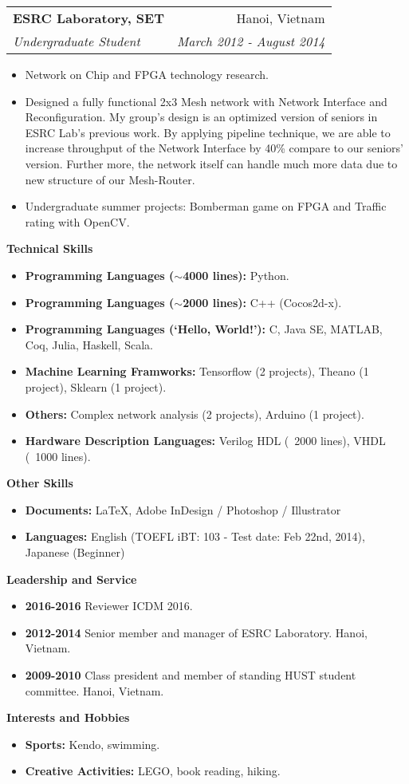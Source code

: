 \documentclass[letter,11pt]{article}
\makeatletter
\newcommand{\resitem}[1]{\item #1 \vspace{-2pt}}
\newcommand{\resheading}[1]{{\large \colorbox{mygrey}{\begin{minipage}{\textwidth}{\textbf{#1 \vphantom{p\^{E}}}}\end{minipage}}}}
\newcommand{\ressubheading}[4]{
\begin{tabular*}{6.5in}{l@{\extracolsep{\fill}}r}
		\textbf{#1} & #2 \\
		\textit{#3} & \textit{#4} \\
\end{tabular*}\vspace{-6pt}}
\makeatother
\begin{document}
\begin{itemize}
\begin{itemize}
    \end{itemize}
	\ressubheading{ESRC Laboratory, SET}{Hanoi, Vietnam}{Undergraduate Student}{March 2012 - August 2014}
	\begin{itemize}
		\resitem{Network on Chip and FPGA technology research.}
		\resitem{Designed a fully functional 2x3 Mesh network with Network Interface and Reconfiguration. My group's design is an optimized version of seniors in ESRC Lab's previous work. By applying pipeline technique, we are able to increase throughput of the Network Interface by 40\% compare to our seniors' version. Further more, the network itself can handle much more data due to new structure of our Mesh-Router.}
        \resitem{Undergraduate summer projects: Bomberman game on FPGA and Traffic rating with OpenCV.}
	\end{itemize}
\end{itemize}

\resheading{Technical Skills}
\begin{itemize}
\item
    \textbf{Programming Languages ($\sim$4000 lines):} Python.
\item
    \textbf{Programming Languages ($\sim$2000 lines):} C++ (Cocos2d-x).
\item 
    \textbf{Programming Languages (`Hello, World!'):} C, Java SE, MATLAB, Coq, Julia, Haskell, Scala.
\item
    \textbf{Machine Learning Framworks:} Tensorflow (2 projects), Theano (1 project), Sklearn (1 project).
\item
    \textbf{Others:} Complex network analysis (2 projects), Arduino (1 project).
\item
    \textbf{Hardware Description Languages:} Verilog HDL (~2000 lines), VHDL (~1000 lines).
\end{itemize}

\resheading{Other Skills}
\begin{itemize}
\item
\textbf{Documents:} \LaTeX, Adobe InDesign / Photoshop / Illustrator
\item
\textbf{Languages:} English (TOEFL iBT: 103 - Test date: Feb 22nd, 2014), Japanese (Beginner)
\end{itemize}

\resheading{Leadership and Service}
\begin{itemize}
\item
    \textbf{2016-2016} Reviewer ICDM 2016.
\item
    \textbf{2012-2014} Senior member and manager of ESRC Laboratory. Hanoi, Vietnam.
\item
    \textbf{2009-2010} Class president and member of standing HUST student committee. Hanoi, Vietnam.
\end{itemize}

\resheading{Interests and Hobbies}
\begin{itemize}
\item
\textbf{Sports:} Kendo, swimming.
\item
\textbf{Creative Activities:} LEGO, book reading, hiking.
\end{itemize}
\end{document}
